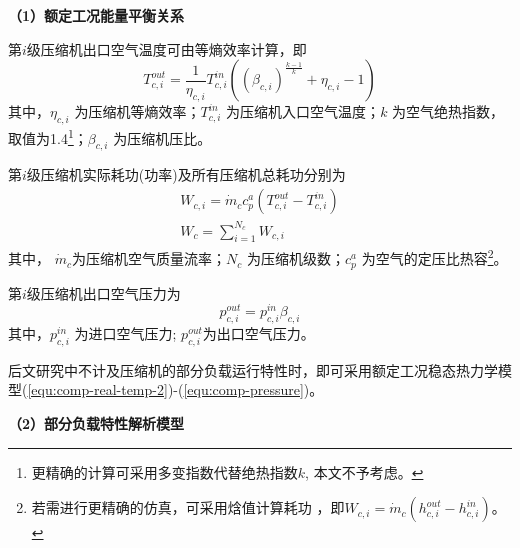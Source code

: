 \textbf{（1）额定工况能量平衡关系}


第$i$级压缩机出口空气温度可由等熵效率计算\cite{Eng-Thermo-83}，即
 \begin{equation}
\label{equ:comp-real-temp-2}
T_{c,i}^{out} = \frac{1}{{{\eta _{c,i}}}}T_{c,i}^{in}({{{({{\beta _{c,i}}})}^{\frac{{k - 1}}{k}}} + {\eta _{c,i}} - 1})
\end{equation}
其中，$\eta _{c,i}$ 为压缩机等熵效率；$T_{c,i}^{in}$ 为压缩机入口空气温度；$k$ 为空气绝热指数，取值为1.4\footnote{更精确的计算可采用多变指数代替绝热指数$k$, 本文不予考虑。}；${\beta _{c,i}}$ 为压缩机压比。

第$i$级压缩机实际耗功(功率)及所有压缩机总耗功分别为
\begin{subequations}
\begin{gather}
{W_{c,i}} = {\dot m_c}c_p^a({T_{c,i}^{out} - T_{c,i}^{in}})\label{equ:comp-power}\\
{W_c} = \sum\limits_{i = 1}^{{N_c}} {} {W_{c,i}} \label{equ:comp-power-total}
\end{gather}
\end{subequations}
其中， $\dot m_c$为压缩机空气质量流率；$N_c$ 为压缩机级数；$c_p^a$ 为空气的定压比热容\footnote{若需进行更精确的仿真，可采用焓值计算耗功
\cite{Eng-Thermo-83}，即${W_{c,i}} = {\dot m_c}({h_{c,i}^{out} - h_{c,i}^{in}})$。}。

第$i$级压缩机出口空气压力为
\begin{equation}
\label{equ:comp-pressure}
p_{c,i}^{out} = p_{c,i}^{in}{\beta _{c,i}}
\end{equation}
其中，$p_{c,i}^{in}$ 为进口空气压力; $p_{c,i}^{out}$为出口空气压力。

后文研究中不计及压缩机的部分负载运行特性时，即可采用额定工况稳态热力学模型(\ref{equ:comp-real-temp-2})-(\ref{equ:comp-pressure})。

\textbf{（2）部分负载特性解析模型}

